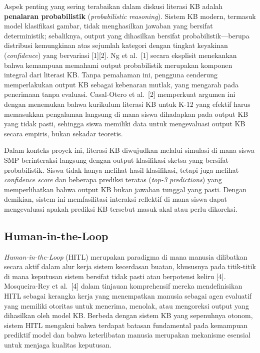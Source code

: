 \documentclass[10pt,twoside,openright]{report}
\begin{document}
Aspek penting yang sering terabaikan dalam diskusi literasi KB adalah \textbf{penalaran probabilistik} (\textit{probabilistic reasoning}). Sistem KB modern, termasuk model klasifikasi gambar, tidak menghasilkan jawaban yang bersifat deterministik; sebaliknya, output yang dihasilkan bersifat probabilistik---berupa distribusi kemungkinan atas sejumlah kategori dengan tingkat keyakinan (\textit{confidence}) yang bervariasi [1][2]. Ng et al.\ [1] secara eksplisit menekankan bahwa kemampuan memahami output probabilistik merupakan komponen integral dari literasi KB. Tanpa pemahaman ini, pengguna cenderung memperlakukan output KB sebagai kebenaran mutlak, yang mengarah pada penerimaan tanpa evaluasi. Casal-Otero et al.\ [2] memperkuat argumen ini dengan menemukan bahwa kurikulum literasi KB untuk K-12 yang efektif harus memasukkan pengalaman langsung di mana siswa dihadapkan pada output KB yang tidak pasti, sehingga siswa memiliki data untuk mengevaluasi output KB secara empiris, bukan sekadar teoretis.

Dalam konteks proyek ini, literasi KB diwujudkan melalui simulasi di mana siswa SMP berinteraksi langsung dengan output klasifikasi sketsa yang bersifat probabilistik. Siswa tidak hanya melihat hasil klasifikasi, tetapi juga melihat \textit{confidence score} dan beberapa prediksi teratas (\textit{top-3 predictions}) yang memperlihatkan bahwa output KB bukan jawaban tunggal yang pasti. Dengan demikian, sistem ini memfasilitasi interaksi reflektif di mana siswa dapat mengevaluasi apakah prediksi KB tersebut masuk akal atau perlu dikoreksi.

\subsection{Human-in-the-Loop}
\label{subsec:hitl}

\textit{Human-in-the-Loop} (HITL) merupakan paradigma di mana manusia dilibatkan secara aktif dalam alur kerja sistem kecerdasan buatan, khususnya pada titik-titik di mana keputusan sistem bersifat tidak pasti atau berpotensi keliru [4]. Mosqueira-Rey et al.\ [4] dalam tinjauan komprehensif mereka mendefinisikan HITL sebagai kerangka kerja yang menempatkan manusia sebagai agen evaluatif yang memiliki otoritas untuk menerima, menolak, atau mengoreksi output yang dihasilkan oleh model KB. Berbeda dengan sistem KB yang sepenuhnya otonom, sistem HITL mengakui bahwa terdapat batasan fundamental pada kemampuan prediktif model dan bahwa keterlibatan manusia merupakan mekanisme esensial untuk menjaga kualitas keputusan.
\end{document}
